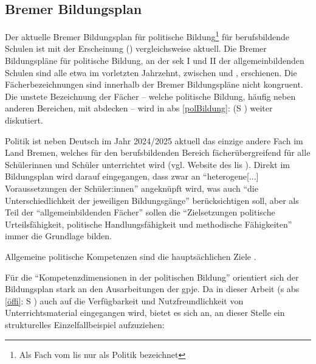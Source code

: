 \begin{quote}
    \autocite[Im Original mit anderen Hervorhebungen:][179-180]{Wehling1977}
\end{quote}



\subsection{Bremer Bildungsplan \label{bplan}} %
Der aktuelle Bremer Bildungsplan für politische Bildung\footnote{Als Fach vom \gls{lis} nur als Politik bezeichnet} für berufsbildende Schulen ist mit der Erscheinung \citeyear{bplan} (\citeauthor{bplan}) vergleichsweise aktuell. Die Bremer Bildungspläne für politische Bildung, an der \gls{sek} I und II der allgemeinbildenden Schulen sind alle etwa im vorletzten Jahrzehnt, zwischen \citeyear{vogel2006gy} \autocites{vogel2006gs, vogel2006gy, lower2008} und \citeyear{vogel2010gp} \autocite{vogel2010gp}, erschienen. Die Fächerbezeichnungen sind innerhalb der Bremer Bildungspläne nicht kongruent. Die unstete Bezeichnung der Fächer -- welche politische Bildung, häufig neben anderen Bereichen, mit abdecken -- wird in \gls{abs} \ref{polBildung}: (\gls{S} \pageref{polBildung}) weiter diskutiert.

Politik ist neben Deutsch im Jahr 2024/2025 aktuell das einzige andere Fach im Land Bremen, welches für den berufsbildenden Bereich fächerübergreifend für alle Schülerinnen und Schüler unterrichtet wird (vgl. Website des \gls{lis} \citeyear{LisBildungspläne}). Direkt im Bildungsplan \autocite[][4]{bplan} wird darauf eingegangen, dass zwar an \enquote{heterogene[...] Voraussetzungen der Schüler:innen} angeknüpft wird, was auch \enquote{die Unterschiedlichkeit der jeweiligen Bildungsgänge} berücksichtigen soll, aber als Teil der \enquote{allgemeinbildenden Fächer} sollen die \enquote{Zielsetzungen politische Urteilsfähigkeit, politische Handlungsfähigkeit und methodische Fähigkeiten} immer die Grundlage bilden. 


Allgemeine politische Kompetenzen sind die hauptsächlichen Ziele \autocite[9-13]{bplan}.

Für die \enquote{Kompetenzdimensionen in der politischen Bildung} orientiert sich der Bildungsplan stark an den Ausarbeitungen der \gls{gpje}.
Da in dieser Arbeit (\gls{s} \gls{abs} \ref{öffi}: \gls{S} \pageref{öffi}) auch auf die Verfügbarkeit und Nutzfreundlichkeit von Unterrichtsmaterial eingegangen wird, bietet es sich an, an dieser Stelle ein strukturelles Einzelfallbeispiel aufzuziehen:

